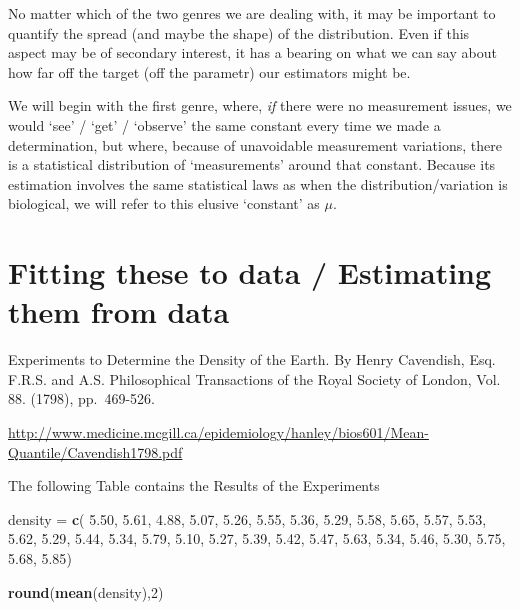 \documentclass[]{book}
\newenvironment{Shaded}{\begin{snugshade}}{\end{snugshade}}
\newcommand{\DecValTok}[1]{\textcolor[rgb]{0.00,0.00,0.81}{#1}}
\newcommand{\FloatTok}[1]{\textcolor[rgb]{0.00,0.00,0.81}{#1}}
\newcommand{\KeywordTok}[1]{\textcolor[rgb]{0.13,0.29,0.53}{\textbf{#1}}}
\newcommand{\NormalTok}[1]{#1}
\newcommand{\StringTok}[1]{\textcolor[rgb]{0.31,0.60,0.02}{#1}}
\begin{document}
No matter which of the two genres we are dealing with, it may be important to quantify the spread (and maybe the shape) of the distribution. Even if this aspect may be of secondary interest, it has a bearing on what we can say about how far off the target (off the parametr) our estimators might be.

We will begin with the first genre, where, \emph{if} there were no measurement issues, we would `see' / `get' / `observe' the same constant every time we made a determination, but where, because of unavoidable measurement variations, there is a statistical distribution of `measurements' around that constant. Because its estimation involves the same statistical laws as when the distribution/variation is biological, we will refer to this elusive `constant' as \(\mu.\)

\hypertarget{fitting-these-to-data-estimating-them-from-data-1}{%
\section{Fitting these to data / Estimating them from data}\label{fitting-these-to-data-estimating-them-from-data-1}}

Experiments to Determine the Density of the Earth. By Henry Cavendish, Esq. F.R.S. and A.S. Philosophical Transactions of the Royal Society of London, Vol. 88. (1798), pp.~469-526.

\url{http://www.medicine.mcgill.ca/epidemiology/hanley/bios601/Mean-Quantile/Cavendish1798.pdf}

The following Table contains the Results of the Experiments

\begin{Shaded}
\begin{Highlighting}[]
\NormalTok{density =}\StringTok{ }\KeywordTok{c}\NormalTok{(}
\FloatTok{5.50}\NormalTok{, }\FloatTok{5.61}\NormalTok{, }\FloatTok{4.88}\NormalTok{, }\FloatTok{5.07}\NormalTok{, }\FloatTok{5.26}\NormalTok{, }\FloatTok{5.55}\NormalTok{, }\FloatTok{5.36}\NormalTok{, }\FloatTok{5.29}\NormalTok{, }\FloatTok{5.58}\NormalTok{, }\FloatTok{5.65}\NormalTok{,}
\FloatTok{5.57}\NormalTok{, }\FloatTok{5.53}\NormalTok{, }\FloatTok{5.62}\NormalTok{, }\FloatTok{5.29}\NormalTok{, }\FloatTok{5.44}\NormalTok{, }\FloatTok{5.34}\NormalTok{, }\FloatTok{5.79}\NormalTok{, }\FloatTok{5.10}\NormalTok{, }\FloatTok{5.27}\NormalTok{, }\FloatTok{5.39}\NormalTok{,}
\FloatTok{5.42}\NormalTok{, }\FloatTok{5.47}\NormalTok{, }\FloatTok{5.63}\NormalTok{, }\FloatTok{5.34}\NormalTok{, }\FloatTok{5.46}\NormalTok{, }\FloatTok{5.30}\NormalTok{, }\FloatTok{5.75}\NormalTok{, }\FloatTok{5.68}\NormalTok{, }\FloatTok{5.85}\NormalTok{)}

\KeywordTok{round}\NormalTok{(}\KeywordTok{mean}\NormalTok{(density),}\DecValTok{2}\NormalTok{)}
\end{Highlighting}
\end{Shaded}
\end{document}
